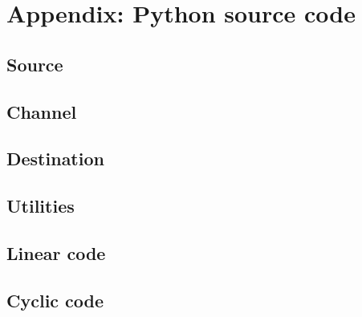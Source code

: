 \documentclass{article}
\begin{document}
\newpage
\section{Appendix: Python source code}
\subsection{Source}
\label{appendix:source}


\subsection{Channel}
\label{appendix:channel}


\subsection{Destination}
\label{appendix:destination}


\subsection{Utilities}
\label{appendix:utils}



\subsection{Linear code}
\label{appendix:linear-code}


\subsection{Cyclic code}
\label{appendix:cyclic-code}

\end{document}
